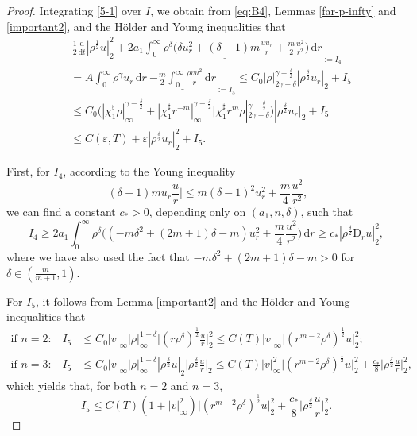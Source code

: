 \documentclass[11pt,reqno]{amsart}
\numberwithin{rk}{section}
\numberwithin{prop}{section}
\numberwithin{mydef}{section}
\numberwithin{lem}{section}
\numberwithin{equation}{section}
\numberwithin{thm}{section}
\begin{document}
\begin{proof}
Integrating \eqref{5-1} over $I$, we obtain from \eqref{eq:B4}, Lemmas \ref{far-p-infty} and \ref{important2}, and the H\"older and Young inequalities that
\begin{equation}\label{503}
\begin{aligned}
&\,\frac{1}{2}\frac{\mathrm{d}}{\mathrm{d}t}|\rho^\frac{1}{2}u|_2^2+ \underline{2a_1 \int_0^\infty\rho^\delta \Big(\delta u_r^2+ (\delta-1) m\frac{u u_r}{r}+  \frac{m}{2} \frac{u^2}{r^2}\Big)\,\mathrm{d}r}_{:=I_4}\\
&=A\int_0^\infty \rho^\gamma u_r\,\mathrm{d}r \ \underline{-\frac{m}{2}\int_0^\infty \frac{\rho v u^2}{r}\,\mathrm{d}r}_{:=I_5}\leq C_0|\rho|_{2\gamma-\delta}^{\gamma-\frac{\delta}{2}}|\rho^\frac{\delta}{2}u_r|_2+I_5\\
&\leq C_0\big(|\chi_1^\flat\rho|_{\infty}^{\gamma-\frac{\delta}{2}}+|\chi_1^\sharp r^{-m}|_\infty^{\gamma-\frac{\delta}{2}}\big|\chi_1^\sharp r^m\rho|_{2\gamma-\delta}^{\gamma-\frac{\delta}{2}}\big) |\rho^\frac{\delta}{2}u_r|_2+I_5\\
&\leq C(\varepsilon,T) +\varepsilon|\rho^\frac{\delta}{2}u_r|_2^2+I_5.
\end{aligned}
\end{equation}


First, for $I_4$, according to the Young inequality
\begin{equation*}
\Big|(\delta-1)mu_r \frac{u }{r}\Big|\leq m(\delta-1)^2u_r^2+\frac{m}{4}\frac{u^2}{r^2},
\end{equation*}
we can find a constant $c_*>0$, depending only on $(a_1,n,\delta)$, such that  
\begin{equation}
I_4\geq 2a_1 \int_0^\infty\rho^\delta \Big((-m\delta^2+(2m+1)\delta-m)u_r^2+ \frac{m}{4} \frac{u^2}{r^2}\Big)\,\mathrm{d}r \geq  c_* |\rho^\frac{\delta}{2}\mathrm{D}_r u|_2^2,
\end{equation}
where we have also used the fact that $-m\delta^2+(2m+1)\delta-m>0$ for $\delta\in (\frac{m}{m+1},1)$.


For $I_5$, it follows from Lemma \ref{important2} and the H\"older and Young inequalities that
\begin{equation*}
\begin{aligned}
\text{if $n=2$:}\quad I_5&\leq C_0|v|_\infty |\rho|_\infty^{1-\delta}\Big|(r\rho^\delta)^\frac{1}{2}\frac{u}{r}\Big|_2^2 \leq C(T)|v|_\infty \big|(r^{m-2}\rho^\delta)^\frac{1}{2}u\big|_2^2;\\
\text{if $n=3$:}\quad I_5&\leq C_0|v|_\infty |\rho|_\infty^{1-\delta}|\rho^\frac{\delta}{2} u|_{2}\Big|\rho^\frac{\delta}{2}\frac{u}{r}\Big|_2 \leq C(T)|v|_\infty^2\big|(r^{m-2}\rho^\delta)^\frac{1}{2}u\big|_2^2+\frac{c_*}{8}\Big|\rho^\frac{\delta}{2}\frac{u}{r}\Big|_2^2,
\end{aligned}
\end{equation*}
which yields that, for both $n=2$ and $n=3$,
\begin{equation}\label{R2-dim2}
I_5\leq C(T)(1+|v|_\infty^2)\big|(r^{m-2}\rho^\delta)^\frac{1}{2}u\big|_2^2+\frac{c_*}{8}\Big|\rho^\frac{\delta}{2}\frac{u}{r}\Big|_2^2.
\end{equation}



\end{proof}
\end{document}
